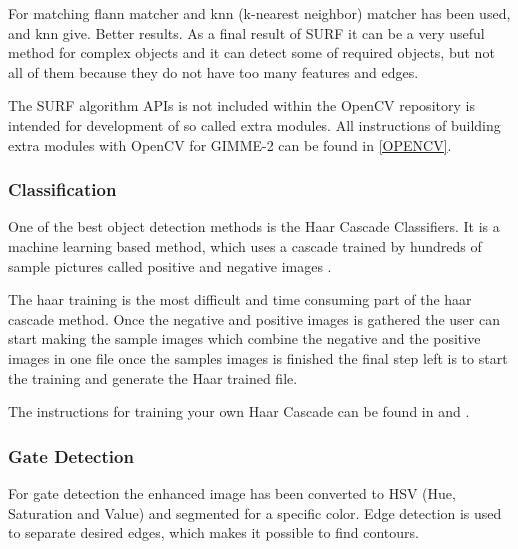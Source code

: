 For matching flann matcher and knn (k-nearest neighbor) matcher has been used, and knn give. Better results. As a final result of SURF it can be a very useful method for complex objects and it can detect some of required objects, but not all of them because they do not have too many features and edges.

The SURF algorithm APIs is not included within the OpenCV repository is intended for development of so called extra modules. All instructions of building extra modules with OpenCV for GIMME-2 can be found in \ref{OPENCV}.

\subsubsection{Classification}
One of the best object detection methods is the Haar Cascade Classifiers. It is a machine learning based method, which uses a cascade trained by hundreds of sample pictures called positive and negative images \cite{Haar_Classification}.

The haar training is the most difficult and time consuming part of the haar cascade method. Once the negative and  positive images is gathered the user can start  making the sample images which combine the negative and the positive images in one file once the samples images is finished the final step left is to start the training and generate the Haar trained file.

The instructions for training your own Haar Cascade can be found in \cite{Haar_Cascade_Training} and
 \cite{Opencv_Haar_Training}.
 
\subsubsection{Gate Detection}
For gate detection the enhanced image has been converted to HSV (Hue, Saturation and Value) and segmented for a specific color. Edge detection is used to separate desired edges, which makes it possible to find contours.